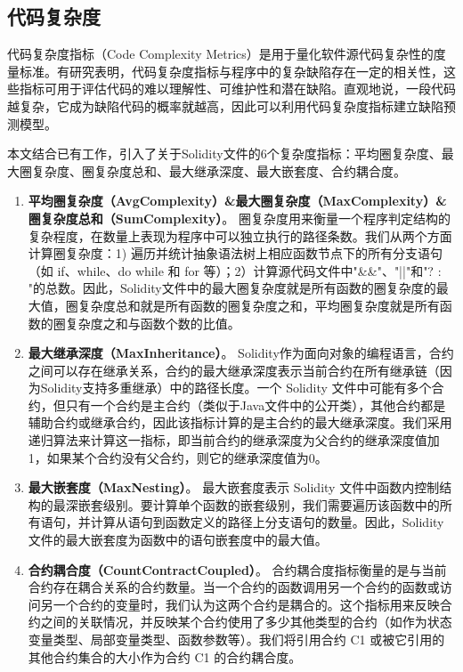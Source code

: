 \subsection{代码复杂度}

代码复杂度指标（Code Complexity Metrics）是用于量化软件源代码复杂性的度量标准。有研究表明\cite{Chen2019AnEI,singh2015bug}，代码复杂度指标与程序中的复杂缺陷存在一定的相关性，这些指标可用于评估代码的难以理解性、可维护性和潜在缺陷。直观地说，一段代码越复杂，它成为缺陷代码的概率就越高，因此可以利用代码复杂度指标建立缺陷预测模型。

本文结合已有工作，引入了关于Solidity文件的6个复杂度指标：平均圈复杂度、最大圈复杂度、圈复杂度总和、最大继承深度、最大嵌套度、合约耦合度。
\begin{enumerate}[label=\Alph*., align=left, leftmargin=*]
    \item \textbf{平均圈复杂度（AvgComplexity）\&最大圈复杂度（MaxComplexity）\&圈复杂度总和（SumComplexity）}。
    圈复杂度用来衡量一个程序判定结构的复杂程度，在数量上表现为程序中可以独立执行的路径条数。我们从两个方面计算圈复杂度：1) 遍历并统计抽象语法树上相应函数节点下的所有分支语句（如 if、while、do while 和 for 等）；2）计算源代码文件中"\&\&"、"||"和"? : "的总数。因此，Solidity文件中的最大圈复杂度就是所有函数的圈复杂度的最大值，圈复杂度总和就是所有函数的圈复杂度之和，平均圈复杂度就是所有函数的圈复杂度之和与函数个数的比值。
    \item \textbf{最大继承深度（MaxInheritance）}。
    Solidity作为面向对象的编程语言，合约之间可以存在继承关系，合约的最大继承深度表示当前合约在所有继承链（因为Solidity支持多重继承）中的路径长度。一个 Solidity 文件中可能有多个合约，但只有一个合约是主合约（类似于Java文件中的公开类），其他合约都是辅助合约或继承合约，因此该指标计算的是主合约的最大继承深度。我们采用递归算法来计算这一指标，即当前合约的继承深度为父合约的继承深度值加1，如果某个合约没有父合约，则它的继承深度值为0。
    \item \textbf{最大嵌套度（MaxNesting）}。
    最大嵌套度表示 Solidity 文件中函数内控制结构的最深嵌套级别。要计算单个函数的嵌套级别，我们需要遍历该函数中的所有语句，并计算从语句到函数定义的路径上分支语句的数量。因此，Solidity 文件的最大嵌套度为函数中的语句嵌套度中的最大值。
    \item \textbf{合约耦合度（CountContractCoupled）}。
    合约耦合度指标衡量的是与当前合约存在耦合关系的合约数量。当一个合约的函数调用另一个合约的函数或访问另一个合约的变量时，我们认为这两个合约是耦合的。这个指标用来反映合约之间的关联情况，并反映某个合约使用了多少其他类型的合约（如作为状态变量类型、局部变量类型、函数参数等）。我们将引用合约 C1 或被它引用的其他合约集合的大小作为合约 C1 的合约耦合度。
\end{enumerate}
